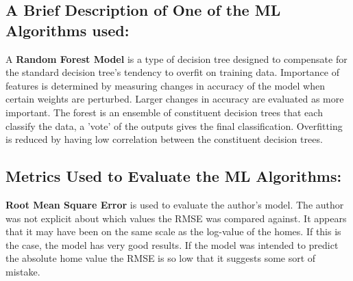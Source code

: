\documentclass[]{article}
\begin{document}
\subsection*{A Brief Description of One of the ML Algorithms used:}
A \textbf{Random Forest Model} is a type of decision tree designed to compensate for the standard decision tree's tendency to overfit on training data.
Importance of features is determined by measuring changes in accuracy of the model when certain weights are perturbed.
Larger changes in accuracy are evaluated as more important.
The forest is an ensemble of constituent decision trees that each classify the data, 
a 'vote' of the outputs gives the final classification. 
Overfitting is reduced by having low correlation between the constituent decision trees.

\subsection*{Metrics Used to Evaluate the ML Algorithms:}
\textbf{Root Mean Square Error} is used to evaluate the author's model. 
The author was not explicit about which values the RMSE was compared against. 
It appears that it may have been on the same scale as the log-value of the homes.
If this is the case, the model has very good results.
If the model was intended to predict the absolute home value the RMSE is so low that it suggests some sort of mistake.
\end{document}
